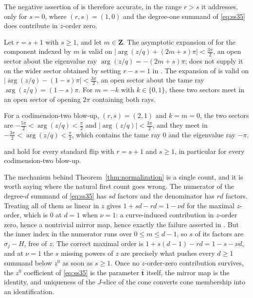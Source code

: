 The negative assertion of \cite[Remark~4.5(3)]{SS} is therefore accurate, in
the range \(r>s\) it addresses, only for \(s=0\), where \((r,s)=(1,0)\) and
the degree-one summand of \eqref{eq:ss35} does contribute in \(z\)-order
zero.

\begin{theorem}
  \label{thm:aperture}
  Let \(r=s+1\) with \(s\ge1\), and let \(m\in\mathbf Z\).  The asymptotic
  expansion of \cite[Proposition~7.5]{SS} for the component indexed by
  \(m\) is valid on
  \(\bigl|\arg(z/q)+(2m+s)\pi\bigr|<\tfrac{3\pi}{2}\), an open sector about
  the eigenvalue ray \(\arg(z/q)=-(2m+s)\pi\); \cite[Theorem~A.1]{SS}
  does not supply it on the wider sector obtained by setting \(r-s=1\)
  in \cite[(64)]{SS}.  The expansion of
  \cite[Proposition~8.2]{SS} is valid on
  \(\bigl|\arg(z/q)-(1-s)\pi\bigr|<\tfrac{3\pi}{2}\), an open sector about
  the tame ray \(\arg(z/q)=(1-s)\pi\).  For \(m=-k\) with \(k\in\{0,1\}\),
  these two sectors meet in an open sector of opening \(2\pi\) containing
  both rays.
\end{theorem}

For a codimension-two blow-up, \((r,s)=(2,1)\) and \(k=m=0\), the two
sectors are \(-\tfrac{5\pi}{2}<\arg(z/q)<\tfrac{\pi}{2}\) and
\(|\arg(z/q)|<\tfrac{3\pi}{2}\), and they meet in
\(-\tfrac{3\pi}{2}<\arg(z/q)<\tfrac{\pi}{2}\), which contains the tame ray
\(0\) and the eigenvalue ray \(-\pi\).

\begin{corollary}
  \label{cor:repaired}
  \cite[Theorems~1.2, 1.4, 9.9 and~9.14]{SS} and \cite[Corollary~1.5]{SS}
  hold for every standard flip with \(r=s+1\) and \(s\ge1\), in particular
  for every codimension-two blow-up.
\end{corollary}

The mechanism behind Theorem~\ref{thm:normalization} is a single count, and
it is worth saying where the natural first count goes wrong.  The numerator
of the degree-\(d\) summand of \eqref{eq:ss35} has \(sd\) factors and the
denominator has \(rd\) factors.  Treating all of them as linear in \(z\)
gives \(1+sd-rd=1-\nu d\) for the maximal \(z\)-order, which is \(0\) at
\(d=1\) when \(\nu=1\): a curve-induced contribution in \(z\)-order zero,
hence a nontrivial mirror map, hence exactly the failure asserted in
\cite[Remark~4.5(3)]{SS}.  But the inner index in the numerator runs over
\(0\le m\le d-1\), so \(s\) of its factors are \(\sigma_{j}-H\), free of
\(z\).  The correct maximal order is \(1+s(d-1)-rd=1-s-\nu d\), and at
\(\nu=1\) the \(s\) missing powers of \(z\) are precisely what pushes every
\(d\ge1\) summand below \(z^{0}\) as soon as \(s\ge1\).  Once no
\(z\)-order-zero contribution survives, the \(z^{0}\) coefficient of
\eqref{eq:ss35} is the parameter \(\bar{\mathbf t}\) itself, the mirror map
is the identity, and uniqueness of the \(J\)-slice of the cone converts cone
membership into an identification.

